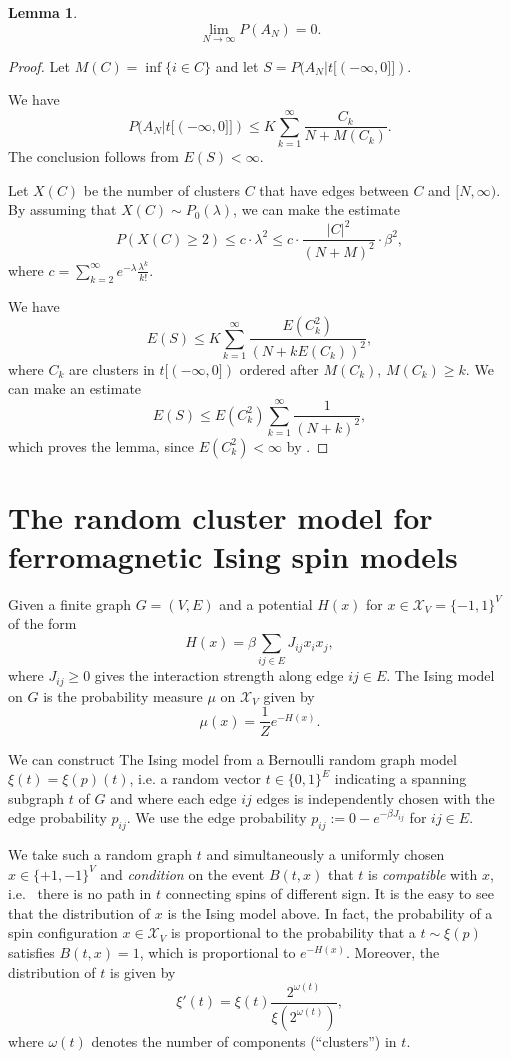 \documentclass[11pt, a4paper, oneside]{article}
\newtheorem{lem}[thm]{Lemma}
\theoremstyle{definition}
\theoremstyle{remark}
\providecommand{\mscr}{\mathscr}
\def\X{\mscr X}
\begin{document}
\begin{lem}
$$\lim_{N\to \infty} P(A_N)=0.$$
\end{lem}

\begin{proof}
Let $M(C)=\inf \{i\in C \}$ and let $S=P(A_N |t[(-\infty, 0]])$.

We have 
$$P(A_N|t[(-\infty, 0]])\leq K \sum_{k=1}^\infty \frac{C_k}{N+M(C_k)}.$$
The conclusion follows from  $E(S)<\infty$.

Let $X(C)$ be the number of clusters $C$ that have edges between $C$ and $[N,\infty)$.
By assuming that $X(C)\sim P_0(\lambda)$, we can make the estimate
$$P(X(C)\geq 2)\leq c\cdot \lambda^2 \leq c\cdot \frac{|C|^2}{(N+M)^2}\cdot \beta^2,$$
where $c=\sum_{k=2}^\infty e^{-\lambda} \frac{\lambda^k}{k!}$.

We have 
$$E(S) \leq K \sum_{k=1}^\infty \frac{E(C_k^2)}{(N+k E(C_k))^2},$$
where $C_k$ are clusters in $t[(-\infty, 0])$ ordered after $M(C_k)$, $M(C_k)\geq k$.
We can make an estimate 
$$E(S)\leq E(C_k^2)\sum _{k=1}^\infty \frac{1}{(N+k)^2},$$
which proves the lemma, since $E(C_k^2)<\infty$ by \cite{kesten}.

\end{proof}

\section{The random cluster model for ferromagnetic Ising spin models}

Given a finite graph $G=(V,E)$ and a potential $H(x)$ for $x\in\X_V=\{-1,1\}^V$ of the form 
\[ H(x) = \beta \sum_{ij\in E}  J_{ij} x_i x_j, \]
where $J_{ij}\geq 0$ gives the interaction strength along edge $ij\in E$. The Ising model on $G$ is the probability measure $\mu$ on $\X_V$ given by 
\[ \mu(x) = \frac 1{Z} e^{-H(x)}. \]

We can construct The Ising model from a Bernoulli random graph model $\xi(t)=\xi(p)(t)$, i.e. a random vector $t\in\{0,1\}^E$ indicating a spanning subgraph $t$ of $G$ and where each edge $ij$ edges is independently chosen with the edge probability $p_{ij}$. We use the edge probability 
\( p_{ij} := 0- e^{-\beta J_{ij}} \) for $ij\in E$. 

We take such a random graph $t$ and simultaneously a uniformly chosen $x\in\{+1,-1\}^V$ and \emph{condition} on the event $B(t,x)$ that $t$ is \emph{compatible} with $x$, i.e.~ there is no path in $t$ connecting spins of different sign. 
It is the easy to see that the distribution of $x$ is the Ising model above. 
In fact, the probability of a spin configuration $x\in\X_V$ is proportional to the probability that a $t\sim\xi(p)$ satisfies $B(t,x)=1$, which is proportional to $e^{-H(x)}$. 
Moreover, the distribution of $t$ is given by 
\[ 
\xi'( t ) = \xi(t) \frac{2^{\omega(t)}}{\xi(2^{\omega(t)})},
\]
where $\omega(t)$ denotes the number of components (``clusters'') in $t$. 
\end{document}
